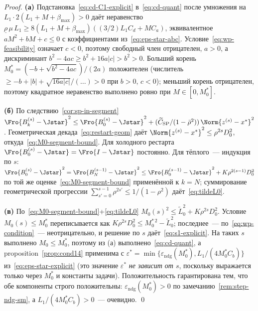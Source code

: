 \begin{proof}
\textbf{(а)} Подстановка~\eqref{eq:cd-C1-explicit} в~\eqref{eq:cd-quant}
после умножения на $L_1\cdot 2(L_1+M+\beta_{\max}) > 0$ даёт
неравенство $\underline\rho\,\mu\,L_1 \ge 8(L_1+M+\beta_{\max})((3/2)L_1 C_d + M C_a)$,
эквивалентное $a M^2 + b M + c \le 0$ с коэффициентами
из~\eqref{eq:eps-star-abc}. Условие~\eqref{eq:wp-feasibility} означает
$c < 0$, поэтому свободный член отрицателен, $a > 0$, а дискриминант
$b^2 - 4 a c \ge b^2 + 16 a |c| > b^2 > 0$. Больший корень
$M_0^{*} = (-b + \sqrt{b^2 - 4 a c})/(2 a)$ положителен (числитель
$\ge -b + |b| + \sqrt{16 a |c|}/(\dots) > 0$ при $b > 0$, $c < 0$);
меньший корень отрицателен, поэтому квадратное неравенство выполнено
ровно при $M \in [0, M_0^{*}]$.

\textbf{(б)} По следствию~\ref{cor:sp-in-segment}
$\Fro{B_k^{(s)} - \Jstar}^2 \le \Fro{B_0^{(s)} - \Jstar}^2 + (\widetilde C_{\mathrm{SP}}/(1-\bar\rho^2))\,\Norm{z^{(s)}-x^{*}}^2$.
Геометрическая декада~\eqref{eq:restart-geom} даёт
$\Norm{z^{(s)}-x^{*}}^2 \le \rho^{2s} D_0^2$, откуда~\eqref{eq:M0-segment-bound}.
Для холодного рестарта $\Fro{B_0^{(s)} - \Jstar} = \Fro{I - \Jstar}$ постоянно. Для
тёплого~--- индукция по $s$:
$\Fro{B_0^{(s)} - \Jstar}^2 = \Fro{B_N^{(s-1)} - \Jstar}^2 \le \Fro{B_0^{(s-1)} - \Jstar}^2 + K \rho^{2(s-1)} D_0^2$
по той же оценке~\eqref{eq:M0-segment-bound} применённой к $k = N$;
суммирование геометрической прогрессии $\sum_{s'=0}^{s-1} \rho^{2 s'} \le 1/(1-\rho^2)$
даёт~\eqref{eq:tildeL0}.

\textbf{(в)} По~\eqref{eq:M0-segment-bound}+\eqref{eq:tildeL0}
$M_0(s)^2 \le \tilde L_0^2 + K \rho^{2s} D_0^2$. Условие
$M_0(s) \le M_0^{*}$ переписывается как $K \rho^{2s} D_0^2 \le M_0^{*\,2} -
\tilde L_0^2$; последнее~--- по~\eqref{eq:wp-condition}~--- неотрицательно,
и решение по $s$ даёт~\eqref{eq:s1-explicit}. На таких $s$ выполнено
$M_0 \le M_0^{*}$, поэтому из (а) выполнено~\eqref{eq:cd-quant}, а
proposition~\ref{prop:cond14} применима с
$\varepsilon^{*} = \min\{\varepsilon_{\mathrm{ndg}}(M_0^{*}),
L_1/(4 M_0^{*} C_b)\}$ из~\eqref{eq:eps-star-explicit} (это значение
$\varepsilon^{*}$ \emph{не зависит от $s$}, поскольку выражается только
через $M_0^{*}$ и константы задачи). Положительность гарантирована тем,
что обе компоненты строго положительны: $\varepsilon_{\mathrm{ndg}}(M_0^{*}) > 0$
по замечанию~\ref{rem:step-ndg-sm}, а $L_1/(4 M_0^{*} C_b) > 0$~--- очевидно. \qed
\end{proof}

